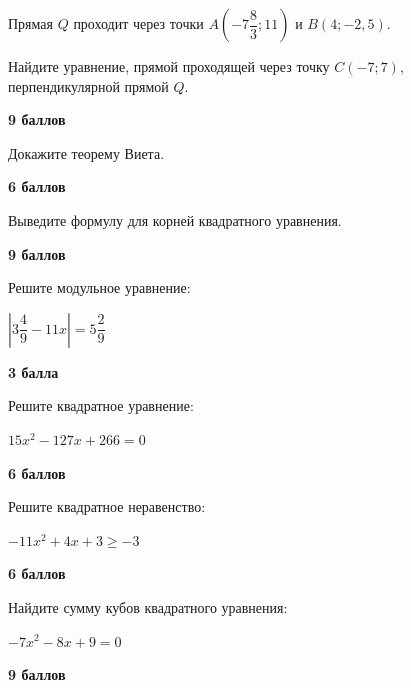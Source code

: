  Прямая $Q$ проходит через точки $A(-7\dfrac{8}{3};11)$ и $B(4;-2,5)$.

Найдите уравнение, прямой проходящей через точку $C(-7;7)$, перпендикулярной прямой $Q$.

\hspace{3mm}

\begin{flushright} \textbf{9 баллов}\\ 
\end{flushright}

\hspace{3mm}
\hspace{3mm}

 Докажите теорему Виета.

\hspace{3mm}

\begin{flushright} \textbf{6 баллов}\\ 
\end{flushright}

 Выведите формулу для корней квадратного уравнения.

\hspace{3mm}

\begin{flushright} \textbf{9 баллов}\\ 
\end{flushright}

 Решите модульное уравнение:

$\left|3\dfrac{4}{9}-11x\right|=5\dfrac{2}{9}$

\hspace{3mm}

\begin{flushright} \textbf{3 балла}\\ 
\end{flushright}

 Решите квадратное уравнение:

$15x^2 - 127x +266 = 0$

\hspace{3mm}

\begin{flushright} \textbf{6 баллов}\\ 
\end{flushright}

 Решите квадратное неравенство:

$-11x^{2}+4x+3\geqslant-3$

\hspace{3mm}

\begin{flushright} \textbf{6 баллов}\\ 
\end{flushright}


 Найдите сумму кубов квадратного уравнения:

$-7x^2 - 8x + 9 = 0$

\hspace{3mm}

\begin{flushright} \textbf{9 баллов}\\ 
\end{flushright}





